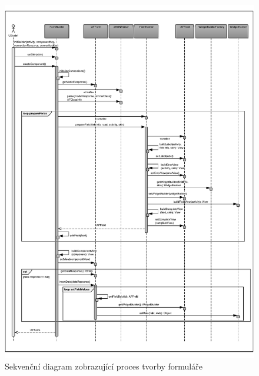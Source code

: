 \begin{figure}
\begin{center}
\includegraphics[width=\textwidth, height=\textheight, keepaspectratio, trim=10 20 10 20, clip]{figures/sequence}
\caption{Sekvenční diagram zobrazující proces tvorby formuláře}
\label{img:sdFormBuilding}
\end{center}
\end{figure}

